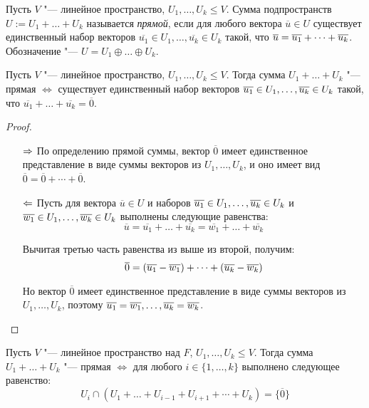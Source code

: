 \begin{definition}
	Пусть $V$ "--- линейное пространство, $U_1, \dots, U_k \le V$. Сумма подпространств $U := U_1 + \dots + U_k$ называется \textit{прямой}, если для любого вектора $\overline{u} \in U$ существует единственный набор векторов $\overline{u_1} \in U_1, \dots, \overline{u_k} \in U_k$ такой, что $\overline{u} \hm{=} \overline{u_1} + \dots + \overline{u_k}$. Обозначение "--- $U = U_1 \oplus \dots \oplus U_k$.
\end{definition}

\begin{proposition}
	Пусть $V$ "--- линейное пространство, $U_1, \dots, U_k \le V$. Тогда сумма $U_1 + \dots + U_k$ "--- прямая $\Leftrightarrow$ существует единственный набор векторов $\overline{u_1} \in U_1, \dots, \overline{u_k} \hm{\in} U_k$ такой, что $\overline{u_1} + \dots + \overline{u_k} = \overline{0}$.
\end{proposition}

\begin{proof}~
	\begin{itemize}
		\item[$\Rightarrow$]По определению прямой суммы, вектор $\overline{0}$ имеет единственное представление в виде суммы векторов из $U_1, \dotsc, U_k$, и оно имеет вид $\overline{0} = \overline{0} + \dotsb + \overline{0}$.
		
		\item[$\Leftarrow$]Пусть для вектора $\overline{u} \in U$ и наборов $\overline{u_1} \in U_1, \dots, \overline{u_k} \hm{\in} U_k$ и $\overline{w_1} \in U_1, \dots, \overline{w_k} \hm{\in} U_k$ выполнены следующие равенства:
		\[\overline{u} = \overline{u_1} + \dots + \overline{u_k} = \overline{w_1} + \dots + \overline{w_k}\]
		
		Вычитая третью часть равенства из выше из второй, получим:
		\[\overline{0} = (\overline{u_1} - \overline{w_1}) \hm{+} \dots + (\overline{u_k} - \overline{w_k})\]
		
		Но вектор $\overline{0}$ имеет единственное представление в виде суммы векторов из $U_1, \dotsc, U_k$, поэтому $\overline{u_1} = \overline{w_1}, \dots, \overline{u_k} \hm{=} \overline{w_k}$.\qedhere
	\end{itemize}
\end{proof}

\begin{theorem}
	Пусть $V$ "--- линейное пространство над $F$, $U_1, \dots, U_k \le V$. Тогда сумма $U_1 + \dots + U_k$ "--- прямая $\Leftrightarrow$ для любого $i \in \{1, \dots, k\}$ выполнено следующее равенство:
	\[U_i \cap (U_1+\dots+U_{i-1}+U_{i+1}+ \dotsb+ U_k) = \{\overline{0}\}\]
\end{theorem}

